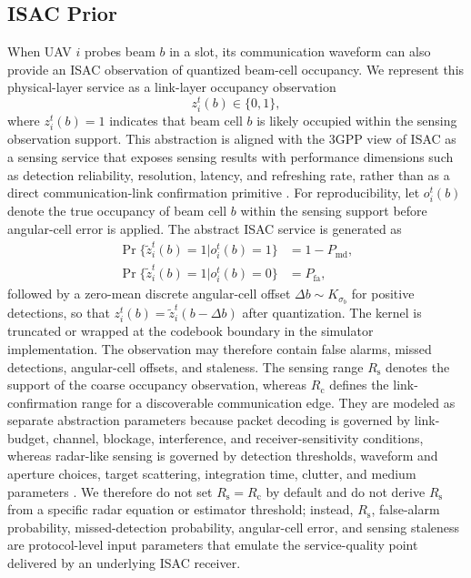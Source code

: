 \documentclass[journal]{IEEEtran}
\newcommand{\Rc}{R_{\mathrm{c}}}
\newcommand{\Rs}{R_{\mathrm{s}}}
\begin{document}
\subsection{ISAC Prior}
When UAV $i$ probes beam $b$ in a slot, its communication waveform can also provide an ISAC observation of quantized beam-cell occupancy.
We represent this physical-layer service as a link-layer occupancy observation
\begin{equation}
  z_i^t(b) \in \{0,1\},
\end{equation}
where $z_i^t(b)=1$ indicates that beam cell $b$ is likely occupied within the sensing observation support.
This abstraction is aligned with the 3GPP view of ISAC as a sensing service that exposes sensing results with performance dimensions such as detection reliability, resolution, latency, and refreshing rate, rather than as a direct communication-link confirmation primitive \cite{ThreeGPP22137ISAC}.
For reproducibility, let $o_i^t(b)$ denote the true occupancy of beam cell $b$ within the sensing support before angular-cell error is applied.
The abstract ISAC service is generated as
\begin{equation}
  \begin{aligned}
  \Pr\{\tilde z_i^t(b)=1|o_i^t(b)=1\} &= 1-P_{\mathrm{md}},\\
  \Pr\{\tilde z_i^t(b)=1|o_i^t(b)=0\} &= P_{\mathrm{fa}},
  \end{aligned}
  \label{eq:isac_detection}
\end{equation}
followed by a zero-mean discrete angular-cell offset $\Delta b\sim K_{\sigma_b}$ for positive detections, so that $z_i^t(b)=\tilde z_i^t(b-\Delta b)$ after quantization.
The kernel is truncated or wrapped at the codebook boundary in the simulator implementation.
The observation may therefore contain false alarms, missed detections, angular-cell offsets, and staleness.
The sensing range $\Rs$ denotes the support of the coarse occupancy observation, whereas $\Rc$ defines the link-confirmation range for a discoverable communication edge.
They are modeled as separate abstraction parameters because packet decoding is governed by link-budget, channel, blockage, interference, and receiver-sensitivity conditions, whereas radar-like sensing is governed by detection thresholds, waveform and aperture choices, target scattering, integration time, clutter, and medium parameters \cite{ThreeGPP38901Channel,Liu2022ISAC6G,Skolnik2001Radar,Bomfin2024SystemISAC}.
We therefore do not set $\Rs=\Rc$ by default and do not derive $\Rs$ from a specific radar equation or estimator threshold; instead, $\Rs$, false-alarm probability, missed-detection probability, angular-cell error, and sensing staleness are protocol-level input parameters that emulate the service-quality point delivered by an underlying ISAC receiver.
\end{document}
